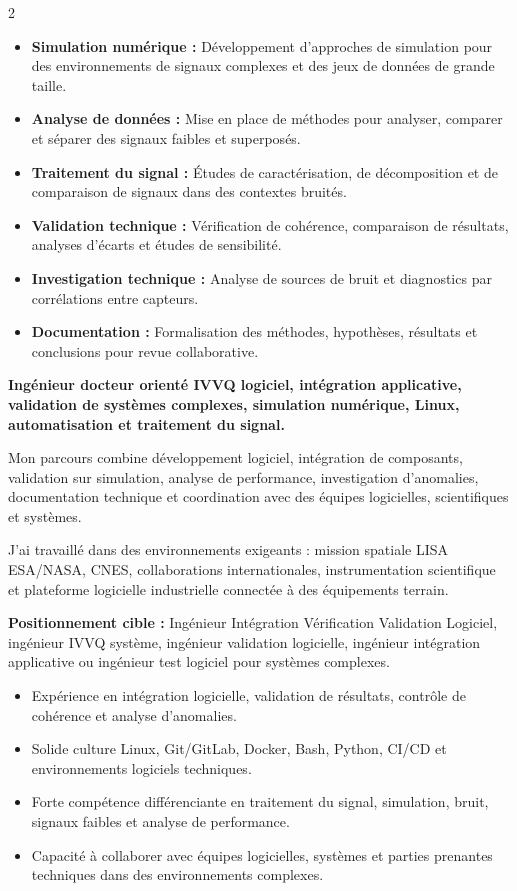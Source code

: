\documentclass[8pt,a4paper,ragged2e,withhyper]{altacv}
\begin{document}
\begin{paracol}{2}
\begin{itemize}
  \item \textbf{Simulation numérique :} Développement d’approches de simulation pour des environnements de signaux complexes et des jeux de données de grande taille.
  \item \textbf{Analyse de données :} Mise en place de méthodes pour analyser, comparer et séparer des signaux faibles et superposés.
  \item \textbf{Traitement du signal :} Études de caractérisation, de décomposition et de comparaison de signaux dans des contextes bruités.
  \item \textbf{Validation technique :} Vérification de cohérence, comparaison de résultats, analyses d’écarts et études de sensibilité.
  \item \textbf{Investigation technique :} Analyse de sources de bruit et diagnostics par corrélations entre capteurs.
  \item \textbf{Documentation :} Formalisation des méthodes, hypothèses, résultats et conclusions pour revue collaborative.
\end{itemize}

\switchcolumn


\textbf{Ingénieur docteur orienté IVVQ logiciel, intégration applicative, validation de systèmes complexes, simulation numérique, Linux, automatisation et traitement du signal.}

Mon parcours combine développement logiciel, intégration de composants, validation sur simulation, analyse de performance, investigation d’anomalies, documentation technique et coordination avec des équipes logicielles, scientifiques et systèmes.

J’ai travaillé dans des environnements exigeants : mission spatiale LISA ESA/NASA, CNES, collaborations internationales, instrumentation scientifique et plateforme logicielle industrielle connectée à des équipements terrain.

\medskip

\textbf{Positionnement cible :} Ingénieur Intégration Vérification Validation Logiciel, ingénieur IVVQ système, ingénieur validation logicielle, ingénieur intégration applicative ou ingénieur test logiciel pour systèmes complexes.

\begin{itemize}
  \item Expérience en intégration logicielle, validation de résultats, contrôle de cohérence et analyse d’anomalies.
  \item Solide culture Linux, Git/GitLab, Docker, Bash, Python, CI/CD et environnements logiciels techniques.
  \item Forte compétence différenciante en traitement du signal, simulation, bruit, signaux faibles et analyse de performance.
  \item Capacité à collaborer avec équipes logicielles, systèmes et parties prenantes techniques dans des environnements complexes.
\end{itemize}


\end{paracol}
\end{document}
